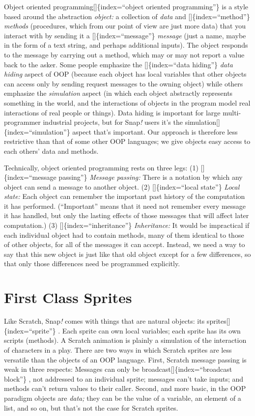 \documentclass[
  letterpaper,
]{book}
\begin{document}
Object oriented programming{[}{]}\{index=``object oriented
programming''\} is a style based around the abstraction \emph{object:} a
collection of \emph{data} and {[}{]}\{index=``method''\} \emph{methods}
(procedures, which from our point of view are just more data) that you
interact with by sending it a {[}{]}\{index=``message''\} \emph{message}
(just a name, maybe in the form of a text string, and perhaps additional
inputs). The object responds to the message by carrying out a method,
which may or may not report a value back to the asker. Some people
emphasize the {[}{]}\{index=``data hiding''\} \emph{data hiding} aspect
of OOP (because each object has local variables that other objects can
access only by sending request messages to the owning object) while
others emphasize the \emph{simulation} aspect (in which each object
abstractly represents something in the world, and the interactions of
objects in the program model real interactions of real people or
things). Data hiding is important for large multi-programmer industrial
projects, but for Snap\emph{!} users it's the
simulation{[}{]}\{index=``simulation''\} aspect that's important. Our
approach is therefore less restrictive than that of some other OOP
languages; we give objects easy access to each others' data and methods.

Technically, object oriented programming rests on three legs: (1)
{[}{]}\{index=``message passing''\} \emph{Message passing:} There is a
notation by which any object can send a message to another object. (2)
{[}{]}\{index=``local state''\} \emph{Local state:} Each object can
remember the important past history of the computation it has performed.
(``Important'' means that it need not remember every message it has
handled, but only the lasting effects of those messages that will affect
later computation.) (3) {[}{]}\{index=``inheritance''\}
\emph{Inheritance:} It would be impractical if each individual object
had to contain methods, many of them identical to those of other
objects, for all of the messages it can accept. Instead, we need a way
to say that this new object is just like that old object except for a
few differences, so that only those differences need be programmed
explicitly.

\section{First Class Sprites}\label{first-class-sprites}

Like Scratch, Snap\emph{!} comes with things that are natural objects:
its sprites{[}{]}\{index=``sprite''\} . Each sprite can own local
variables; each sprite has its own scripts (methods). A Scratch
animation is plainly a simulation of the interaction of characters in a
play. There are two ways in which Scratch sprites are less versatile
than the objects of an OOP language. First, Scratch message passing is
weak in three respects: Messages can only be
broadcast{[}{]}\{index=``broadcast block''\} , not addressed to an
individual sprite; messages can't take inputs; and methods can't return
values to their caller. Second, and more basic, in the OOP paradigm
objects are \emph{data;} they can be the value of a variable, an element
of a list, and so on, but that's not the case for Scratch sprites.
\end{document}
